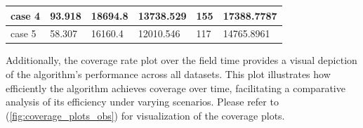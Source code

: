 \begin{table}[H]
\begin{tabular}{llllll}
    \rowcolor[HTML]{FFFFC7} 
    case 4                  & 93.918                                                                                 & 18694.8                                                                                   & 13738.529                                                                           & 155                                                                        & 17388.7787                                                                                 \\ \hline
    \rowcolor[HTML]{FFFFC7} 
    case 5                  & 58.307                                                                                 & 16160.4                                                                                   & 12010.546                                                                           & 117                                                                        & 14765.8961                                                                                 \\ \hline
    \end{tabular}
    \end{table}

\vspace*{6mm}

Additionally, the coverage rate plot over the field time provides a visual depiction of the algorithm's performance across all datasets. This plot illustrates how efficiently the algorithm achieves coverage over time, facilitating a comparative analysis of its efficiency under varying scenarios. Please refer to (\autoref{fig:coverage_plots_obs}) for visualization of the coverage plots.

